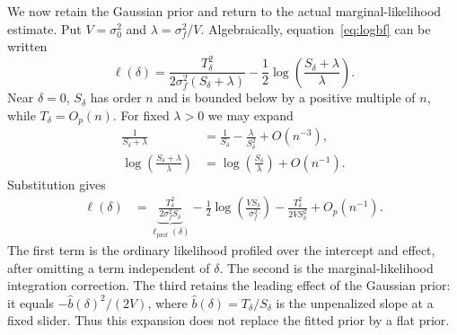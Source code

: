 \documentclass[11pt]{article}
\begin{document}
We now retain the Gaussian prior and return to the actual
marginal-likelihood estimate. Put $V=\sigma_0^2$ and
$\lambda=\sigma_f^2/V$. Algebraically, equation~\eqref{eq:logbf}
can be written
\begin{equation}
\ell(\delta)
=\frac{T_\delta^2}{2\sigma_f^2(S_\delta+\lambda)}
 -\frac12\log\left(\frac{S_\delta+\lambda}{\lambda}\right).
\label{eq:eb-objective-for-expansion}
\end{equation}
Near $\delta=0$, $S_\delta$ has order $n$ and is bounded below
by a positive multiple of $n$, while $T_\delta=O_p(n)$.
For fixed $\lambda>0$ we may expand
\begin{align}
\frac1{S_\delta+\lambda}
 &=\frac1{S_\delta}-\frac{\lambda}{S_\delta^2}
   +O(n^{-3}),\nonumber\\
\log\left(\frac{S_\delta+\lambda}{\lambda}\right)
 &=\log\left(\frac{S_\delta}{\lambda}\right)+O(n^{-1}).
\end{align}
Substitution gives
\begin{align}
\ell(\delta)
 &=\underbrace{\frac{T_\delta^2}{2\sigma_f^2S_\delta}}
               _{\ell_{\mathrm{prof}}(\delta)}
   -\frac12\log\left(\frac{VS_\delta}{\sigma_f^2}\right)
   -\frac{T_\delta^2}{2VS_\delta^2}+O_p(n^{-1}).
\label{eq:eb-profile-expansion}
\end{align}
The first term is the ordinary likelihood profiled over the
intercept and effect, after omitting a term independent of $\delta$.
The second is the marginal-likelihood integration correction.
The third retains the leading effect of the Gaussian prior:
it equals $-\widehat b(\delta)^2/(2V)$, where
$\widehat b(\delta)=T_\delta/S_\delta$ is the unpenalized slope
at a fixed slider. Thus this expansion does not replace the fitted
prior by a flat prior.
\end{document}
